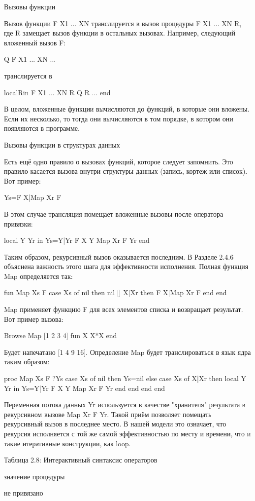 Вызовы функции

Вызов функции {F X1 ... XN} транслируется в вызов процедуры {F X1 ... XN R}, где R замещает вызов функции в остальных вызовах. Например, следующий вложенный вызов F:

{Q {F X1 ... XN} ... }

транслируется в

localRin
{F X1 ... XN R}
{Q R ... }
end

В целом, вложенные функции вычисляются до функций, в которые они вложены. Если их несколько, то тогда они вычисляются в том порядке, в котором они появляются в программе.

Вызовы функции в структурах данных

Есть ещё одно правило о вызовах функций, которое следует запомнить. Это правило касается вызова внутри структуры данных (запись, кортеж или список). Вот пример:

Ys={F X}|{Map Xr F}

В этом случае трансляция помещает вложенные вызовы после оператора привязки:

local Y Yr in
Ys=Y|Yr
{F X Y}
{Map Xr F Yr}
end

Таким образом, рекурсивный вызов оказывается последним. В Разделе 2.4.6 объяснена важность этого шага для эффективности исполнения. Полная функция Map определяется так:

fun {Map Xs F}
case Xs
of nil then nil
[] X|Xr then {F X}|{Map Xr F}
end
end

Map применяет функцию F для всех элементов списка и возвращает результат. Вот пример вызова:

{Browse {Map [1 2 3 4] fun { X} X*X end}}

Будет напечатано [1 4 9 16]. Определение Map будет транслироваться в язык ядра таким образом:

proc {Map Xs F ?Ys}
case Xs of nil then Ys=nil
else case Xs of X|Xr then
local Y Yr in
Ys=Y|Yr
{F X Y}
{Map Xr F Yr}
end
end end
end

Переменная потока данных Yr используется в качестве "хранителя" результата в рекурсивном вызове {Map Xr F Yr}. Такой приём позволяет помещать рекурсивный вызов в последнее место. В нашей модели это означает, что рекурсия исполняется с той же самой эффективностью по месту и времени, что и такие итеративные конструкции, как loop.

Таблица 2.8: Интерактивный синтаксис операторов

значение процедуры

не привязано

